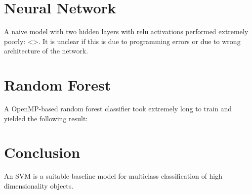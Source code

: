 \documentclass{article}
\begin{document}
\section{Neural Network}
A naive model with two hidden layers with relu activations performed extremely poorly: <>.
It is unclear if this is due to programming errors or due to wrong architecture of the network.


\section{Random Forest}
A OpenMP-based random forest classifier took extremely long to train and yielded the following result:


\section{Conclusion}
An SVM is a suitable baseline model for multiclass classification of high dimensionality objects.
\end{document}
